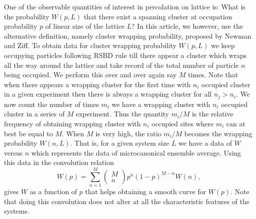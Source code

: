 \documentclass[twocolumn,showpacs,preprintnumbers,amsmath,amssymb]{article}
\begin{document}
One of the observable quantities of interest in percolation on lattice is: What is the probability
$W(p,L)$ that there exist a spanning cluster at occupation probability $p$ of linear size of the lattice $L$? 
In this article, we however, use the alternative definition, namely cluster wrapping probability, proposed
by Newman and Ziff. To obtain data for cluster wrapping probability $W(p,L)$ 
we keep occupying particles following RSBD rule till there appear a cluster which wraps all the way
around the lattice and take record of the total number of particle $n$ being occupied.  We perform this
over and over again say $M$ times. Note that when there appears a wrapping cluster for the first time 
with $n_i$ occupied cluster in a given experiment then there is always a wrapping cluster for all $n_j>n_i$. 
We now count the number of times $m_i$ we have a wrapping cluster with $n_i$ occupied cluster
in a series of $M$ experiment. Thus the quantity $m_i/M$ is the relative
frequency of obtaining wrapping cluster with $n_{i}$ occupied sites where $m_i$ can at best be equal
to $M$. When $M$ is very high, the ratio $m_i/M$ becomes the wrapping 
probability $W(n,L)$. That is, for a given system size $L$ we have a data of $W$ versus $n$ which
represents the data of microcanonical ensemble average. Using this data in the convolution relation
\begin{equation}
\label{eq:convolution}
W(p)=\sum_{n=1}^M \left( \begin{array}{c}
M \\ n \end{array}\right ) p^n(1-p)^{M-n} W(n),
\end{equation}
gives $W$ as a function of $p$ that helps obtaining a smooth curve for $W(p)$. Note
that doing this convolution does not alter at all the characteristic features of the systems.  
\end{document}
